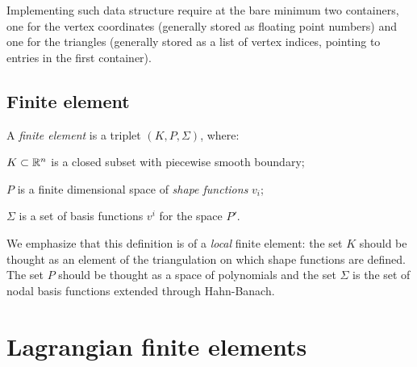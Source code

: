 Implementing such data structure require at the bare minimum two containers, one for the vertex coordinates (generally stored as floating point numbers) and one for the triangles (generally stored as a list of vertex indices, pointing to entries in the first container).

\subsection{Finite element}

\begin{definition}[Ciarlet, 1978] 
A \emph{finite element} is a triplet $(K,P,\Sigma)$, where:
\begin{romanlist}
\item $K\subset \mathbb{R}^n$ is a closed subset with piecewise smooth boundary;
\item $P$ is a finite dimensional space of \emph{shape functions} $v_i$;
\item $\Sigma$ is a set of basis functions $v^i$ for the space $P'$.
\end{romanlist}
\end{definition}

We emphasize that this definition is of a \emph{local} finite element: the set $K$ should be thought as an element of the triangulation on which shape functions are defined. The set $P$ should be thought as a space of polynomials and the set $\Sigma$ is the set of nodal basis functions extended through Hahn-Banach.


\section{Lagrangian finite elements}